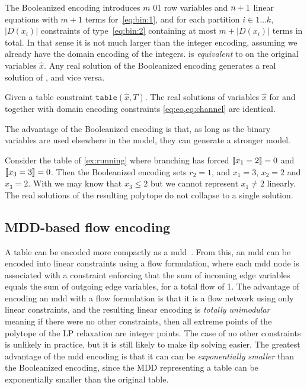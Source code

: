 \documentclass[a4paper,UKenglish,cleveref,autoref,thm-restate]{lipics-v2021}
\newcommand{\milp}{\gls{ilp}\xspace}
\begin{document}
The Booleanized encoding introduces $m$ 01 row variables
and $n+1$ linear equations with $m+1$ terms for~\cref{eq:bin:1}, and for each partition $i \in 1 \dots k$, $|D(x_i)|$ constraints of type~\cref{eq:bin:2} containing at most $m + |D(x_i)|$ terms in total. In that sense it is not much larger than the integer encoding, assuming we already have the domain encoding of the integers.
\baseBool is \emph{equivalent} to \baseGleb  on the original variables $\hat{x}$.
Any real solution of the Booleanized encoding generates a real solution of \baseGleb, and vice versa.

\begin{theorem}
    Given a table constraint $\texttt{table}(\hat{x},T)$.
    The real solutions of variables $\hat{x}$ for \baseGleb and 
    \baseBool together with domain encoding constraints \cref{eq:eo,eq:channel} are identical.
\end{theorem}

The advantage of the Booleanized encoding is that, as long as the binary variables are used elsewhere in the model, they can generate a stronger model.
\begin{example}
  Consider the table of \cref{ex:running} where branching has forced $[\![x_{1} = 2]\!]  = 0$ and
  $[\![x_{3} = 3]\!] = 0$. Then the Booleanized 
  encoding sets $r_2 = 1$, and
  $x_1 = 3$, $x_2 = 2$ and $x_3 = 2$.
  With \baseGleb we may know that $x_3 \leq 2$ but we cannot represent $x_1 \neq 2$ linearly. The real solutions of the resulting polytope do not collapse to a single solution.
\end{example}

\subsection{MDD-based flow encoding}
\label{sec:encoding:mdd}

A table can be encoded more compactly as a \gls{mdd}~\cite{DBLP:journals/constraints/ChengY10}.
From this, an \gls{mdd} can be encoded into linear constraints using a flow formulation, where each \gls{mdd} node is associated with a constraint enforcing that the sum of incoming edge variables equals the sum of outgoing edge variables, for a total flow of 1.
The advantage of encoding an \gls{mdd} with a flow formulation is that it is a flow network using only linear constraints, and the resulting linear encoding is \emph{totally unimodular}~\cite{ahuja1993network} meaning if there were no other constraints, then all extreme points of the polytope of the LP relaxation are integer points.
The case of no other constraints is unlikely in practice, but it is still likely to make \milp solving easier.
The greatest advantage of the \gls{mdd} encoding is that it can can be \emph{exponentially smaller} than the Booleanized encoding, 
since the MDD representing a table can be exponentially smaller than the original table.
\end{document}
